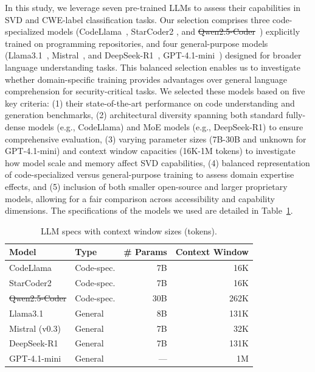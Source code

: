 \documentclass[lettersize,journal]{IEEEtran}
\makeatletter
\providecommand{\DIFadd}[1]{{\protect\color{blue}\uwave{#1}}} %
\providecommand{\DIFdel}[1]{{\protect\color{red}\sout{#1}}} %
\providecommand{\DIFaddbegin}{} %
\providecommand{\DIFaddend}{} %
\providecommand{\DIFdelbegin}{} %
\providecommand{\DIFdelend}{} %
\providecommand{\DIFaddFL}[1]{\DIFadd{#1}} %
\providecommand{\DIFdelFL}[1]{\DIFdel{#1}} %
\providecommand{\DIFaddbeginFL}{} %
\providecommand{\DIFaddendFL}{} %
\providecommand{\DIFdelbeginFL}{} %
\providecommand{\DIFdelendFL}{} %
\newcommand{\DIFscaledelfig}{0.5}
\newlength{\DIFdelgraphicswidth} %
\newlength{\DIFdelgraphicsheight} %
\newcommand{\DIFaddincludegraphics}[2][]{{\color{blue}\fbox{\DIFOincludegraphics[#1]{#2}}}} %
\newcommand{\DIFdelincludegraphics}[2][]{%
\sbox{\DIFdelgraphicsbox}{\DIFOincludegraphics[#1]{#2}}%
\settoboxwidth{\DIFdelgraphicswidth}{\DIFdelgraphicsbox} %
\settoboxtotalheight{\DIFdelgraphicsheight}{\DIFdelgraphicsbox} %
\scalebox{\DIFscaledelfig}{%
\parbox[b]{\DIFdelgraphicswidth}{\usebox{\DIFdelgraphicsbox}\\[-\baselineskip] \rule{\DIFdelgraphicswidth}{0em}}\llap{\resizebox{\DIFdelgraphicswidth}{\DIFdelgraphicsheight}{%
\setlength{\unitlength}{\DIFdelgraphicswidth}%
\begin{picture}(1,1)%
\thicklines\linethickness{2pt} %
{\color[rgb]{1,0,0}\put(0,0){\framebox(1,1){}}}%
{\color[rgb]{1,0,0}\put(0,0){\line( 1,1){1}}}%
{\color[rgb]{1,0,0}\put(0,1){\line(1,-1){1}}}%
\end{picture}%
}\hspace*{3pt}}} %
} %
\DeclareRobustCommand{\DIFaddbegin}{\DIFOaddbegin \let\includegraphics\DIFaddincludegraphics} %
\DeclareRobustCommand{\DIFaddend}{\DIFOaddend \let\includegraphics\DIFOincludegraphics} %
\DeclareRobustCommand{\DIFdelbegin}{\DIFOdelbegin \let\includegraphics\DIFdelincludegraphics} %
\DeclareRobustCommand{\DIFdelend}{\DIFOaddend \let\includegraphics\DIFOincludegraphics} %
\DeclareRobustCommand{\DIFaddbeginFL}{\DIFOaddbeginFL \let\includegraphics\DIFaddincludegraphics} %
\DeclareRobustCommand{\DIFaddendFL}{\DIFOaddendFL \let\includegraphics\DIFOincludegraphics} %
\DeclareRobustCommand{\DIFdelbeginFL}{\DIFOdelbeginFL \let\includegraphics\DIFdelincludegraphics} %
\DeclareRobustCommand{\DIFdelendFL}{\DIFOaddendFL \let\includegraphics\DIFOincludegraphics} %
\let\sout@orig\sout %
\renewcommand{\sout}[1]{\ifmmode\text{\sout@orig{\ensuremath{#1}}}\else\sout@orig{#1}\fi} %
\makeatother
\begin{document}
In this study, we leverage seven pre-trained \glspl{LLM} to assess their capabilities in \gls{SVD} and CWE-label classification tasks. Our selection comprises three code-specialized models (CodeLlama~\cite{roziere2023code}, StarCoder2 \cite{lozhkov2024starcoder}, and \DIFdelbegin \DIFdel{Qwen2.5-Coder}\DIFdelend \DIFaddbegin \DIFadd{Qwen3-Coder}\DIFaddend ~\cite{yang2025qwen3}) explicitly trained on programming repositories, and four general-purpose models (Llama3.1~\cite{dubey2024llama}, Mistral~\cite{jiang2023mistral7b}, and DeepSeek-R1~\cite{guo2025deepseek}, GPT-4.1-mini~\cite{openai2025gpt4_1mini}) designed for broader language understanding tasks. This balanced selection enables us to investigate whether domain-specific training provides advantages over general language comprehension for security-critical tasks. We selected these models based on five key criteria: (1) their state-of-the-art performance on code understanding and generation benchmarks, (2) architectural diversity spanning both standard fully-dense models (e.g., CodeLlama) and \gls{MoE} models (e.g., DeepSeek-R1) to ensure comprehensive evaluation, (3) varying parameter sizes (7B-30B and unknown for GPT-4.1-mini) and context window capacities (16K-1M tokens) to investigate how model scale and memory affect \gls{SVD} capabilities, (4) balanced representation of code-specialized versus general-purpose training to assess domain expertise effects, and (5) inclusion of both smaller open-source and larger proprietary models, allowing for a fair comparison across accessibility and capability dimensions. The specifications of the models we used are detailed in Table~\ref{table:llm-specs}.

\begin{table}[!t]
\centering
\caption{LLM specs with context window sizes (tokens).}
\label{table:llm-specs}
\footnotesize
\setlength{\tabcolsep}{6pt}
\renewcommand{\arraystretch}{1.1}
\begin{tabular}{@{}l l r r@{}}
\toprule
\textbf{Model} & \textbf{Type} & \textbf{\# Params} & \textbf{Context Window} \\
\midrule
CodeLlama & Code-spec. & 7B & 16K \\
StarCoder2 & Code-spec. & 7B & 16K \\
\DIFdelbeginFL \DIFdelFL{Qwen2.5-Coder }\DIFdelendFL \DIFaddbeginFL \DIFaddFL{Qwen3-Coder }\DIFaddendFL & Code-spec. & 30B & 262K \\
Llama3.1 & General & 8B & 131K \\
Mistral (v0.3) & General & 7B & 32K \\
DeepSeek-R1 & General & 7B & 131K \\
GPT-4.1-mini & General & --- & 1M \\
\bottomrule
\end{tabular}
\end{table}
\end{document}
